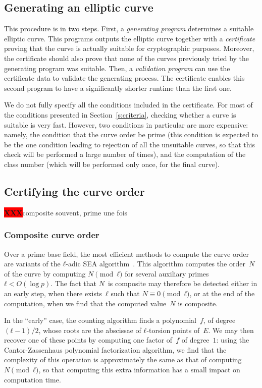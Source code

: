 \documentclass{article}
\def\XXX{{\colorbox{red}{{\color{white}\bfseries XXX}}}}
\begin{document}
\subsection{Generating an elliptic curve}

This procedure is in two steps.
First, a \emph{generating program} determines a suitable elliptic curve.
This programs outputs the elliptic curve
together with a \emph{certificate} proving that
the curve is actually suitable for cryptographic purposes.
Moreover, the certificate should also prove that
none of the curves previously tried by the generating program
was suitable.
Then, a \emph{validation program} can use the certificate data
to validate the generating process.
The certificate enables this second program
to have a significantly shorter runtime than the first one.

We do not fully specify all the conditions included in the certificate.
For most of the conditions presented in Section~\ref{s:criteria},
checking whether a curve is suitable is very fast.
However, two conditions in particular are more expensive:
namely, the condition that the curve order be prime
(this condition is expected to be the one condition
leading to rejection of all the unsuitable curves,
so that this check will be performed a large number of times),
and the computation of the class number
(which will be performed only once, for the final curve).

\subsection{Certifying the curve order}

\XXX composite souvent, prime une fois

\subsubsection{Composite curve order}

Over a prime base field,
the most efficient methods to compute the curve order are
variants of the $ℓ$-adic SEA algorithm~\cite{mathcomp1985schoof,
jtnb1995schoof}.
This algorithm computes the order~$N$ of the curve
by computing $N \pmod{ℓ}$ for several
auxiliary primes~$ℓ < O(\log p)$.
The fact that $N$~is composite may therefore be detected
either in an early step,
when there exists~$ℓ$ such that $N ≡ 0 \pmod{ℓ}$,
or at the end of the computation,
when we find that the computed value~$N$ is composite.

In the “early” case,
the counting algorithm finds a polynomial~$f$, of degree~$(ℓ-1)/2$,
whose roots are the abscissae of $ℓ$-torsion points of~$E$.
We may then recover one of these points by
computing one factor of~$f$ of degree~$1$:
using the Cantor-Zassenhaus polynomial factorization algorithm,
we find that the complexity of this operation
is approximately the same as that of computing~$N \pmod{ℓ}$,
so that computing this extra information
has a small impact on computation time.
\end{document}
